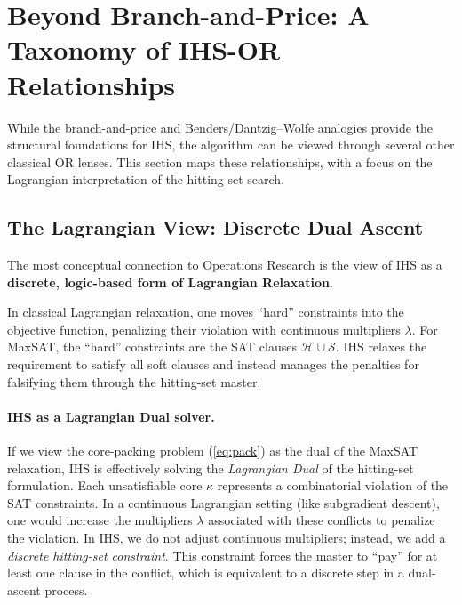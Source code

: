 \section{Beyond Branch-and-Price: A Taxonomy of IHS-OR Relationships}
\label{sec:taxonomy}

While the branch-and-price and Benders/Dantzig--Wolfe analogies provide the
structural foundations for IHS, the algorithm can be viewed through several
other classical OR lenses. This section maps these relationships, with a focus
on the Lagrangian interpretation of the hitting-set search.

\subsection{The Lagrangian View: Discrete Dual Ascent}
\label{sec:lagrangian}

The most conceptual connection to Operations Research is the view of IHS as a
\textbf{discrete, logic-based form of Lagrangian Relaxation}.

In classical Lagrangian relaxation, one moves ``hard'' constraints into the
objective function, penalizing their violation with continuous multipliers
$\lambda$. For MaxSAT, the ``hard'' constraints are the SAT clauses
$\mathcal{H} \cup \mathcal{S}$. IHS relaxes the requirement to satisfy all soft
clauses and instead manages the penalties for falsifying them through the
hitting-set master.

\paragraph{IHS as a Lagrangian Dual solver.}
If we view the core-packing problem (\cref{eq:pack}) as the dual of the MaxSAT
relaxation, IHS is effectively solving the \emph{Lagrangian Dual} of the
hitting-set formulation. Each unsatisfiable core $\kappa$ represents a
combinatorial violation of the SAT constraints. In a continuous Lagrangian
setting (like subgradient descent), one would increase the multipliers $\lambda$
associated with these conflicts to penalize the violation. In IHS, we do not
adjust continuous multipliers; instead, we add a \emph{discrete hitting-set
constraint}. This constraint forces the master to ``pay'' for at least one
clause in the conflict, which is equivalent to a discrete step in a dual-ascent
process.

